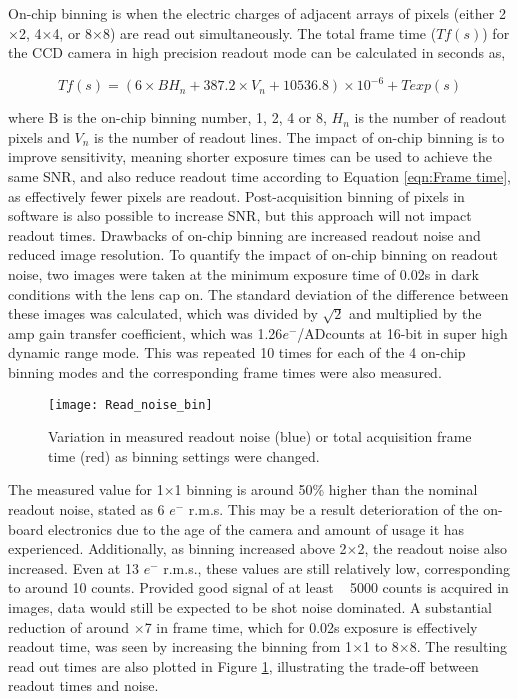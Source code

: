 \documentclass[twoside]{bhamthesis}
\theoremstyle{definition}
\begin{document}
On-chip binning is when the electric charges of adjacent arrays of pixels (either 2$\times$2, 4$\times$4, or 8$\times$8) are read out simultaneously. The total frame time ($Tf(s)$) for the CCD camera in high precision readout mode can be calculated in seconds as,

\begin{equation}
  \label{eqn:Frame time}
Tf(s) = (6 \times B H_n + 387.2 \times V_n + 10536.8) \times 10^{-6} + Texp(s)
\end{equation}

where B is the on-chip binning number, 1, 2, 4 or 8, $H_n$ is the number of readout pixels and $V_n$ is the number of readout lines. The impact of on-chip binning is to improve sensitivity, meaning shorter exposure times can be used to achieve the same SNR, and also reduce readout time according to Equation \ref{eqn:Frame time}, as effectively fewer pixels are readout. Post-acquisition binning of pixels in software is also possible to increase SNR, but this approach will not impact readout times. Drawbacks of on-chip binning are increased readout noise and reduced image resolution. To quantify the impact of on-chip binning on readout noise, two images were taken at the minimum exposure time of 0.02s in dark conditions with the lens cap on. The standard deviation of the difference between these images was calculated, which was divided by $\sqrt{2}$ and multiplied by the amp gain transfer coefficient, which was 1.26$e^-$/ADcounts at 16-bit in super high dynamic range mode. This was repeated 10 times for each of the 4 on-chip binning modes and the corresponding frame times were also measured.

\begin{figure}[!ht]
\texttt{[image: Read\_noise\_bin]}
\centering
\caption{Variation in measured readout noise (blue) or total acquisition frame time (red) as binning settings were changed. }
\centering
\label{fig:Read_noise_bin}
\end{figure}

The measured value for 1$\times$1 binning is around 50\% higher than the nominal readout noise, stated as 6 $e^-$ r.m.s. This may be a result deterioration of the on-board electronics due to the age of the camera and amount of usage it has experienced. Additionally, as binning increased above 2$\times$2, the readout noise also increased. Even at 13 $e^-$ r.m.s., these values are still relatively low, corresponding to around 10 counts. Provided good signal of at least ~ 5000 counts is acquired in images, data would still be expected to be shot noise dominated. A substantial reduction of around $\times$7 in frame time, which for 0.02s exposure is effectively readout time, was seen by increasing the binning from 1$\times$1 to 8$\times$8. The resulting read out times are also plotted in Figure \ref{fig:Read_noise_bin}, illustrating the trade-off between readout times and noise.
\end{document}

